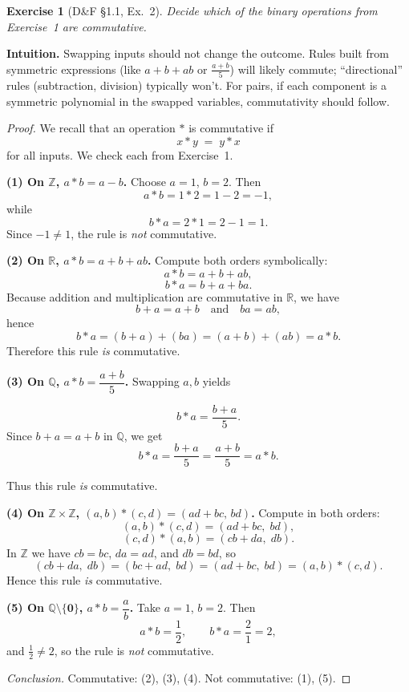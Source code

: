 \documentclass[12pt]{article}
\newtheorem{exercise}[theorem]{Exercise}
\theoremstyle{definition}
\begin{document}
\newpage

\begin{exercise}[D\&F §1.1, Ex.~2]
Decide which of the binary operations from Exercise~1 are commutative.
\end{exercise}

\dotfill

\noindent
\textbf{Intuition.}
Swapping inputs should not change the outcome. Rules built from symmetric expressions (like $a+b+ab$ or $\tfrac{a+b}{5}$) will likely commute; “directional” rules (subtraction, division) typically won’t. For pairs, if each component is a symmetric polynomial in the swapped variables, commutativity should follow.

\dotfill

\begin{proof}
We recall that an operation $*$ is commutative if
\[
x*y \;=\; y*x
\]
for all inputs. We check each from Exercise~1.

\dotfill

\noindent\textbf{(1) On $\boldsymbol{\mathbb{Z}}$, $a*b=a-b$.}
Choose $a=1$, $b=2$. Then
\[
a*b = 1*2 = 1-2 = -1,
\]
while
\[
b*a = 2*1 = 2-1 = 1.
\]
Since $-1\neq 1$, the rule is \emph{not} commutative.

\dotfill

\noindent\textbf{(2) On $\boldsymbol{\mathbb{R}}$, $a*b=a+b+ab$.}
Compute both orders symbolically:
\[
a*b = a+b+ab,
\]
\[
b*a = b+a+ba.
\]
Because addition and multiplication are commutative in $\mathbb{R}$, we have
\[
b+a = a+b
\quad\text{and}\quad
ba = ab,
\]
hence
\[
b*a = (b+a)+(ba) = (a+b)+(ab) = a*b.
\]
Therefore this rule \emph{is} commutative.

\dotfill

\noindent\textbf{(3) On $\boldsymbol{\mathbb{Q}}$, $a*b=\dfrac{a+b}{5}$.}
Swapping $a,b$ yields

\[
b*a=\frac{b+a}{5}.
\]
Since $b+a=a+b$ in $\mathbb{Q}$, we get
\[
b*a=\frac{b+a}{5}=\frac{a+b}{5}=a*b.
\]

Thus this rule \emph{is} commutative.

\dotfill

\noindent\textbf{(4) On $\boldsymbol{\mathbb{Z}\times\mathbb{Z}}$, $(a,b)*(c,d)=(ad+bc,\,bd)$.}
Compute in both orders:
\[
(a,b)*(c,d)=(ad+bc,\;bd),
\]
\[
(c,d)*(a,b)=(cb+da,\;db).
\]
In $\mathbb{Z}$ we have $cb=bc$, $da=ad$, and $db=bd$, so
\[
(cb+da,\;db)=(bc+ad,\;bd)=(ad+bc,\;bd)=(a,b)*(c,d).
\]
Hence this rule \emph{is} commutative.

\dotfill

\noindent\textbf{(5) On $\boldsymbol{\mathbb{Q}\setminus\{0\}}$, $a*b=\dfrac{a}{b}$.}
Take $a=1$, $b=2$. Then
\[
a*b=\frac{1}{2},\qquad b*a=\frac{2}{1}=2,
\]
and $\tfrac{1}{2}\neq 2$, so the rule is \emph{not} commutative.

\dotfill

\noindent\emph{Conclusion.}
Commutative: (2), (3), (4).
Not commutative: (1), (5).
\end{proof}
\end{document}
